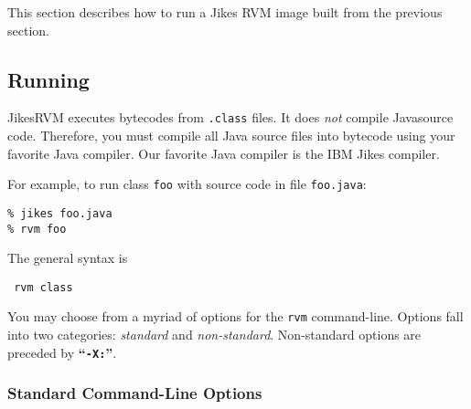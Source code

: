 This section describes how to run a Jikes\TMweb{}{} RVM  image built
from the previous section. 

\subsection{Running \jrvm}

Jikes\TMweb RVM executes bytecodes from {\tt .class} files. It does {\em
not} compile 
Java\TMweb source code. Therefore, you must compile all Java source
files into bytecode using your favorite Java compiler.
Our favorite Java compiler is the IBM Jikes compiler. 

For example, to run class {\tt foo} with source code in file {\tt foo.java}:
\begin{verbatim}
% jikes foo.java
% rvm foo 
\end{verbatim}

The general syntax is
\begin{example}
\tt{}   rvm  class 
\end{example}

You may choose from a myriad of options for the {\tt rvm} command-line.  
Options fall into two categories: {\em standard} and {\em
non-standard}.  Non-standard options are preceded by {\bf ``{\tt -X:}''}.

\subsubsection{Standard Command-Line Options}

